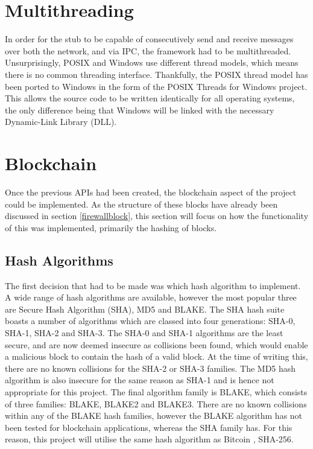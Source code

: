 \documentclass[a4paper, 11pt]{report}
\begin{document}
\section{Multithreading}
In order for the \gls{stub} to be capable of consecutively send and receive messages over both the network, and via \acrshort{IPC}, the framework had to be multithreaded. Unsurprisingly, \acrshort{POSIX} and Windows use different thread models, which means there is no common threading interface. Thankfully, the \acrshort{POSIX} thread model has been ported to Windows in the form of the \acrshort{POSIX} Threads for Windows project\cite{pthread}. This allows the source code to be written identically for all operating systems, the only difference being that Windows will be linked with the necessary Dynamic-Link Library (DLL).

\section{Blockchain}
Once the previous \acrshort{API}s had been created, the \gls{blockchain} aspect of the project could be implemented. As the structure of these blocks have already been discussed in section \ref{firewallblock}, this section will focus on how the functionality of this was implemented, primarily the hashing of blocks.

\subsection{Hash Algorithms} 
The first decision that had to be made was which hash algorithm to implement. A wide range of hash algorithms are available, however the most popular three are Secure Hash Algorithm (SHA), MD5 and BLAKE. The SHA hash suite boasts a number of algorithms which are classed into four generations: SHA-0, SHA-1, SHA-2 and SHA-3. The SHA-0 and SHA-1 algorithms are the least secure, and are now deemed insecure as collisions been found, which would enable a malicious block to contain the hash of a valid block. At the time of writing this, there are no known collisions for the SHA-2 or SHA-3 families. The MD5 hash algorithm is also insecure for the same reason as SHA-1 and is hence not appropriate for this project. The final algorithm family is BLAKE, which consists of three families: BLAKE, BLAKE2 and BLAKE3. There are no known collisions within any of the BLAKE hash families, however the BLAKE algorithm has not been tested for \gls{blockchain} applications, whereas the SHA family has. For this reason, this project will utilise the same hash algorithm as Bitcoin \cite{bitcoin}, SHA-256.
\end{document}
